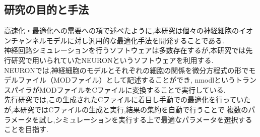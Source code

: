 \subsection{研究の目的と手法}
高速化・最適化への需要への項で述べたように,本研究は個々の神経細胞のイオンチャンネルモデルに対し汎用的な最適化手法を開発することである.\\
神経回路シミュレーションを行うソフトウェアは多数存在するが,本研究では先行研究で用いられていたNEURONというソフトウェアを利用する.\\
NEURONでは,神経細胞のモデルとそれぞれの細胞の関係を微分方程式の形でモデルファイル（MODファイル）として記述することができ,
nmodlというトランスパイラがMODファイルをCファイルに変換することで実行している.\\
先行研究では,この生成されたCファイルに着目し手動での最適化を行っていたが,本研究ではCファイルの生成と実行,結果の集約を自動で行うことで
複数のパラメータを試し,シミュレーションを実行する上で最適なパラメータを選択することを目指す.\\
